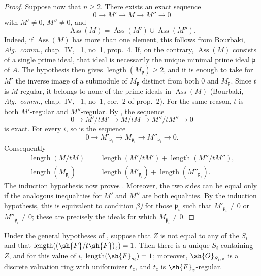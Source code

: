 \begin{proof}
Suppose now that $n\geqslant 2$.
There exists an exact sequence
\[
0\longrightarrow M'\longrightarrow M\longrightarrow M''\longrightarrow 0
\]
with $M'\neq 0$, $M''\neq 0$, and
\[
\operatorname{Ass}(M)=\operatorname{Ass}(M')\cup\operatorname{Ass}(M'').
\]
Indeed, if $\operatorname{Ass}(M)$ has more than one element, this follows from Bourbaki, \emph{Alg.\ comm.}, chap.~IV, \textsection~1, no~1, prop.~4.
If, on the contrary, $\operatorname{Ass}(M)$ consists of a single prime ideal, that ideal is necessarily the unique minimal prime ideal $\mathfrak p$ of $A$.
The hypothesis then gives $\operatorname{length}(M_{\mathfrak p})\geqslant 2$, and it is enough to take for $M'$ the inverse image of a submodule of $M_{\mathfrak p}$ distinct from both $0$ and $M_{\mathfrak p}$.
Since $t$ is $M$-regular, it belongs to none of the prime ideals in $\operatorname{Ass}(M)$ (Bourbaki, \emph{Alg.\ comm.}, chap.~IV, \textsection~1, no~1, cor.~2 of prop.~2).
For the same reason, $t$ is both $M'$-regular and $M''$-regular.
By , the sequence
\[
0\longrightarrow M'/tM'
 \longrightarrow M/tM
 \longrightarrow M''/tM''
 \longrightarrow 0
\]
is exact.
For every $i$, so is the sequence
\[
0\longrightarrow M'_{\mathfrak p_i}
 \longrightarrow M_{\mathfrak p_i}
 \longrightarrow M''_{\mathfrak p_i}
 \longrightarrow 0.
\]
Consequently
\[
\begin{aligned}
\operatorname{length}(M/tM)
  &=
  \operatorname{length}(M'/tM')
  +
  \operatorname{length}(M''/tM''),\\
\operatorname{length}(M_{\mathfrak p_i})
  &=
  \operatorname{length}(M'_{\mathfrak p_i})
  +
  \operatorname{length}(M''_{\mathfrak p_i}).
\end{aligned}
\]
The induction hypothesis now proves .
Moreover, the two sides can be equal only if the analogous inequalities for $M'$ and $M''$ are both equalities.
By the induction hypothesis, this is equivalent to condition \emph{$\beta$)} for those $\mathfrak p_i$ such that $M'_{\mathfrak p_i}\neq 0$ or $M''_{\mathfrak p_i}\neq 0$; these are precisely the ideals for which $M_{\mathfrak p_i}\neq 0$.
\end{proof}


\begin{corollary}[3.4.2]
\label{IV.3.4.2}
Under the general hypotheses of , suppose that $Z$ is not equal to any of the $S_i$ and that $\operatorname{length}((\sh{F}/t\sh{F})_z)=1$.
Then there is a unique $S_i$ containing $Z$, and for this value of $i$, $\operatorname{length}(\sh{F}_{s_i})=1$; moreover, $\sh{O}_{S_i,z}$ is a discrete valuation ring with uniformizer $t_z$, and $t_z$ is $\sh{F}_z$-regular.
\end{corollary}

